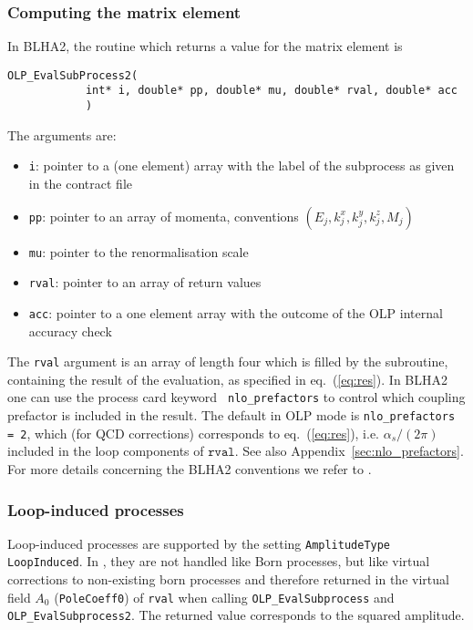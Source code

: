 \subsubsection{Computing the matrix element}
In BLHA2, the routine which returns a value for the matrix element is
\begin{lstlisting}[style=C]
      OLP_EvalSubProcess2(
            int* i, double* pp, double* mu, double* rval, double* acc
            )
\end{lstlisting}
The arguments are:
\begin{itemize}
\item \texttt{i}: pointer to a (one element) array with the label of the subprocess as given in the contract file
\item \texttt{pp}: pointer to an array of momenta, conventions $(E_j,k_j^x,k_j^y,k_j^z,M_j)$
\item \texttt{mu}: pointer to the renormalisation scale 
\item \texttt{rval}: pointer to an array of return values
\item \texttt{acc}: pointer to a one element array with the outcome of the 
OLP internal accuracy check 
\end{itemize}
The \texttt{rval} argument is an array of length four which is filled by the subroutine, containing the result of the evaluation, as specified in eq.~(\ref{eq:res}). In BLHA2 one can use the process card keyword \texttt{ nlo\_prefactors} to control which coupling prefactor is included in the result. The default in OLP mode is \texttt{nlo\_prefactors = 2}, which (for QCD corrections) corresponds to eq.~(\ref{eq:res}), i.e. $\alpha_s/(2\pi)$ included in the loop components of $\texttt{rval}$. See also Appendix~\ref{sec:nlo_prefactors}. For more details concerning the BLHA2 conventions we refer to \cite{Alioli:2013nda}.


\subsubsection{Loop-induced processes}
Loop-induced processes are supported by the setting \lstinline[style=sh]|AmplitudeType LoopInduced|. In \gosam, they are not handled like Born processes, but like virtual corrections to non-existing born processes and therefore returned in the virtual field $A_0$ (\texttt{PoleCoeff0}) of \texttt{rval} when calling \texttt{OLP\_EvalSubprocess} and \texttt{OLP\_EvalSubprocess2}. The returned value corresponds to the  squared amplitude.


